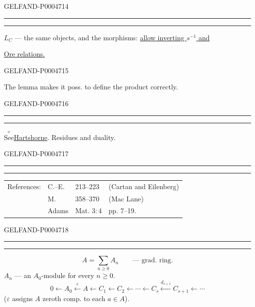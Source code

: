 \begin{GelfandAdjacentEvidence}{GELFAND-P000471}{4}


{\centering\rule{3em}{.4pt}\quad\textperiodcentered\quad\rule{3.4em}{.4pt}\par}
$L_C$ — the same objects, and the morphisms: \uline{allow inverting \mbox{$s^{-1}$} and}
\par\hspace*{3em}\uline{Ore relations.}
\end{GelfandAdjacentEvidence}
\begin{GelfandAdjacentEvidence}{GELFAND-P000471}{5}

The lemma makes it poss. to define the product correctly.
\end{GelfandAdjacentEvidence}
\begin{GelfandAdjacentEvidence}{GELFAND-P000471}{6}


{\centering\rule{3em}{.4pt}\quad\textperiodcentered\quad\rule{3.5em}{.4pt}\par}
\(\overset{\scriptstyle +}{\text{See}}\)\quad\uline{Hartshorne}. Residues and duality.
\end{GelfandAdjacentEvidence}
\begin{GelfandAdjacentEvidence}{GELFAND-P000471}{7}


{\centering\rule{3.9em}{.4pt}\quad\textperiodcentered\quad\rule{3.4em}{.4pt}\par}

\begin{tabular}{@{}llll@{}}
References: & C.–E. & 213--223 & (Cartan and Eilenberg)\\
 & M. & 358--370 & (Mac Lane)\\
 & Adams & Mat. $3\colon4$ & pp. 7--19.
\end{tabular}
\end{GelfandAdjacentEvidence}
\begin{GelfandAdjacentEvidence}{GELFAND-P000471}{8}


{\centering\rule{2.8em}{.4pt}\quad\textperiodcentered\quad\rule{3em}{.4pt}\par}
\[
A=\sum_{n\geqslant0}A_n\qquad\text{— grad. ring.}
\]
$A_n$ — an $A_0$-module for every $n\geqslant0$.
\[
0\longleftarrow A_0\xleftarrow{\varepsilon}A
\longleftarrow C_1\longleftarrow C_2\longleftarrow\cdots
\longleftarrow C_s\xleftarrow{d_{s+1}}C_{s+1}\longleftarrow\cdots
\]
($\varepsilon$ assigns $A$ zeroth comp. to each $a\in A$).
\end{GelfandAdjacentEvidence}
